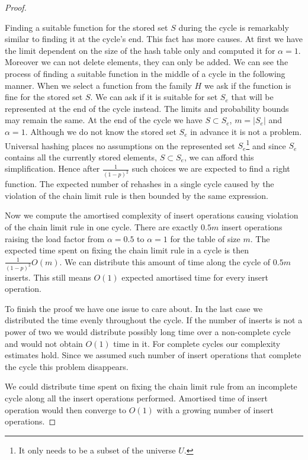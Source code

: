 \begin{proof}
\begin{itemize}
Finding a suitable function for the stored set $S$ during the cycle is remarkably similar to finding it at the cycle's end. This fact has more causes. At first we have the limit dependent on the size of the hash table only and computed it for $\alpha = 1$. Moreover we can not delete elements, they can only be added. We can see the process of finding a suitable function in the middle of a cycle in the following manner. When we select a function from the family $H$ we ask if the function is fine for the stored set $S$. We can ask if it is suitable for set $S_e$ that will be represented at the end of the cycle instead. The limits and probability bounds may remain the same. At the end of the cycle we have $S \subset S_e$, $m = |S_e|$ and $\alpha = 1$. Although we do not know the stored set $S_e$ in advance it is not a problem. Universal hashing places no assumptions on the represented set $S_e$\footnote{It only needs to be a subset of the universe $U$.} and since $S_e$ contains all the currently stored elements, $S \subset S_e$, we can afford this simplification. Hence after $\frac{1}{(1-p)^2}$ such choices we are expected to find a right function. The expected number of rehashes in a single cycle caused by the violation of the chain limit rule is then bounded by the same expression. 

Now we compute the amortised complexity of insert operations causing violation of the chain limit rule in one cycle. There are exactly $0.5 m$ insert operations raising the load factor from $\alpha = 0.5$ to $\alpha = 1$ for the table of size $m$. The expected time spent on fixing the chain limit rule in a cycle is then $\frac{1}{(1 - p)^2}O(m)$. We can distribute this amount of time along the cycle of $0.5 m$ inserts. This still means $O(1)$ expected amortised time for every insert operation.
\end{itemize}

To finish the proof we have one issue to care about. In the last case we distributed the time evenly throughout the cycle. If the number of inserts is not a power of two we would distribute possibly long time over a non-complete cycle and would not obtain $O(1)$ time in it. For complete cycles our complexity estimates hold. Since we assumed such number of insert operations that complete the cycle this problem disappears.

We could distribute time spent on fixing the chain limit rule from an incomplete cycle along all the insert operations performed. Amortised time of insert operation would then converge to $O(1)$ with a growing number of insert operations.
\end{proof}

